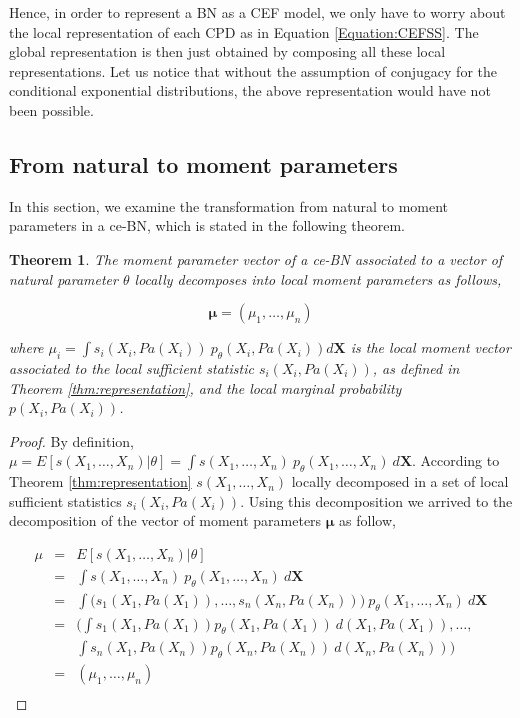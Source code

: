 \documentclass[11pt, oneside]{article}   	%
\newtheorem{theorem}{Theorem}
\newcommand{\bm}{\mathbf}
\numberwithin{figure}{section}
\numberwithin{equation}{section}
\numberwithin{table}{section}
\newcommand{\e}[1]{E\left[ #1 \right]}
\theoremstyle{definition}
\begin{document}
Hence, in order to represent a BN as a CEF model, we only have to worry about the local representation of each CPD as in Equation \ref{Equation:CEFSS}. The global representation is then just obtained by composing all these local representations. Let us notice that without the assumption of conjugacy  for the conditional exponential distributions, the above representation would have not been possible. 


\subsection{From natural to moment parameters} \label{Section:CEFBN:NaturalToMoment}

In this section, we examine the transformation from natural to moment parameters in a ce-BN, which is stated in the following theorem. 

\begin{theorem}
\label{thm:naturalToMoment}
The moment parameter vector of a ce-BN associated to a vector of natural parameter $\theta$ locally decomposes into local moment parameters as follows,

$$\bm \mu = (\mu_1,\ldots,\mu_n)$$

\noindent where $\mu_i= \int s_i(X_i,Pa(X_i))~p_\theta(X_i,Pa(X_i))d\bm X$ is the local moment vector associated to the local sufficient statistic $s_i(X_i,Pa(X_i))$, as defined in Theorem \ref{thm:representation},  and the local marginal probability $p(X_i,Pa(X_i))$.
\end{theorem}
\begin{proof}
By definition, $\mu = \e{s(X_1,\ldots,X_n)|\theta} = \int s(X_1,\ldots, X_n)~p_\theta(X_1,\ldots, X_n)~d\bm X$. According to Theorem \ref{thm:representation}  $s(X_1,\ldots, X_n)$ locally decomposed in a set of local sufficient statistics $s_i(X_i,Pa(X_i))$. Using this decomposition we arrived to the decomposition of the vector of moment parameters $\bm \mu$ as follow,

\begin{equation*}
\begin{array}{lll}
\mu & = & \e{s(X_1,\ldots, X_n)|\theta} \\
&=& \int s(X_1,\ldots, X_n)~p_\theta(X_1,\ldots, X_n)~d\bm X\\
&=& \int \big(s_1(X_1,Pa(X_1)),\ldots, s_n(X_n,Pa(X_n))\big)~p_\theta(X_1,\ldots, X_n)~d\bm X\\
&=&  \Big(\int s_1(X_1,Pa(X_1)) p_\theta(X_1,Pa(X_1))~d(X_1,Pa(X_1)) ,\ldots, \\ 
& &   \int s_n(X_1,Pa(X_n)) p_\theta(X_n,Pa(X_n))~d(X_n,Pa(X_n))\Big)\\
&=& (\mu_1,\ldots,\mu_n) \\
\end{array}
\end{equation*}
\end{proof}
\end{document}

